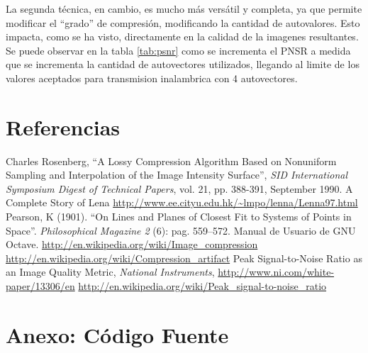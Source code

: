 \documentclass[twocolumn,a4paper,10pt]{article}
\begin{document}
La segunda t\'ecnica, en cambio, es mucho m\'as vers\'atil y completa, ya que permite modificar el ``grado'' de compresi\'on, modificando la cantidad de autovalores. 
Esto impacta, como se ha visto, directamente en la calidad de la imagenes resultantes.
Se puede observar en la tabla \ref{tab:psnr} como se incrementa el PNSR a medida que se incrementa la cantidad de autovectores utilizados, llegando al limite de los valores aceptados para transmision inalambrica con 4 autovectores.

\section*{Referencias}
\begin{thebibliography}{99}
    
    Charles Rosenberg, ``A Lossy Compression Algorithm Based on Nonuniform Sampling and Interpolation of the Image Intensity Surface'', \textit{SID International Symposium Digest of Technical Papers}, vol. 21, pp. 388-391, September 1990.
    A Complete Story of Lena \url{http://www.ee.cityu.edu.hk/~lmpo/lenna/Lenna97.html}
     Pearson, K (1901). ``On Lines and Planes of Closest Fit to Systems of Points in Space''. \textit{Philosophical Magazine 2} (6): pag. 559–572.
     Manual de Usuario de GNU Octave.
     \url{http://en.wikipedia.org/wiki/Image\_compression}
     \url{http://en.wikipedia.org/wiki/Compression\_artifact}
     Peak Signal-to-Noise Ratio as an Image Quality Metric, \textit{National Instruments}, \url{http://www.ni.com/white-paper/13306/en}
     \url{http://en.wikipedia.org/wiki/Peak_signal-to-noise_ratio}

\end{thebibliography}

\newpage
\section*{Anexo: Código Fuente}
    
    
    
\end{document}
